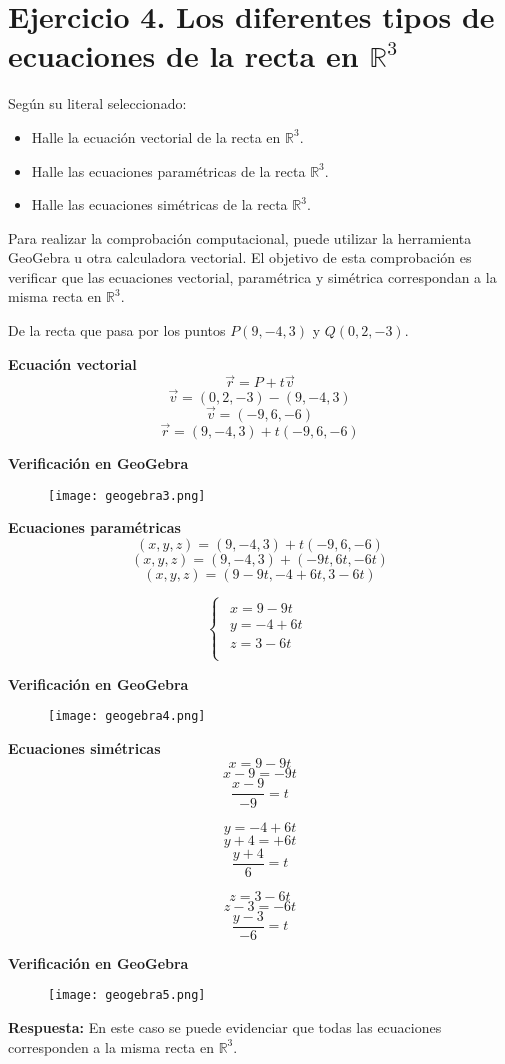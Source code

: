 \section{\large Ejercicio 4. Los diferentes tipos de ecuaciones de la recta en $\mathbb{R}^{3}$}

Según su literal seleccionado:
\begin{itemize}
    \item Halle la ecuación vectorial de la recta en $\mathbb{R}^{3}$.
    \item Halle las ecuaciones paramétricas de la recta $\mathbb{R}^{3}$.
    \item Halle las ecuaciones simétricas de la recta $\mathbb{R}^{3}$.
\end{itemize}

Para realizar la comprobación computacional, puede utilizar la herramienta GeoGebra u otra calculadora vectorial. El objetivo de esta comprobación es verificar que las ecuaciones vectorial, paramétrica y simétrica correspondan a la misma recta en $\mathbb{R}^{3}$.

De la recta que pasa por los puntos $P(9,-4,3)$ y $Q(0,2,-3)$.

\textbf{Ecuación vectorial}
\[\vec{r}=P+t\vec{v}\]
\[\vec{v}=(0,2,-3)-(9,-4,3)\]
\[\vec{v}=(-9,6,-6)\]
\[\vec{r}=(9,-4,3)+t(-9,6,-6)\]

\textbf{Verificación en GeoGebra}

\begin{figure}[ht!]
    \texttt{[image: geogebra3.png]}
\end{figure}

\textbf{Ecuaciones paramétricas}
\[(x,y,z)=(9,-4,3)+t(-9,6,-6)\]
\[(x,y,z)=(9,-4,3)+(-9t,6t,-6t)\]
\[(x,y,z)=(9-9t,-4+6t,3-6t)\]

\[
    \begin{cases}
        \begin{array}{l}
            x=9-9t \\
            y=-4+6t \\
            z=3-6t \\
        \end{array}
    \end{cases}
\]

\newpage
\textbf{Verificación en GeoGebra}

\begin{figure}[ht!]
    \texttt{[image: geogebra4.png]}
\end{figure}

\textbf{Ecuaciones simétricas}
\[x=9-9t\]
\[x-9=-9t\]
\[\frac{x-9}{-9}=t\]

\[y=-4+6t\]
\[y+4=+6t\]
\[\frac{y+4}{6}=t\]

\[z=3-6t\]
\[z-3=-6t\]
\[\frac{y-3}{-6}=t\]

\newpage
\textbf{Verificación en GeoGebra}

\begin{figure}[ht!]
    \texttt{[image: geogebra5.png]}
\end{figure}

\textbf{Respuesta:} En este caso se puede evidenciar que todas las ecuaciones corresponden a la misma recta en $\mathbb{R}^{3}$.